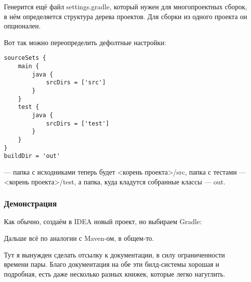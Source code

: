 \documentclass[a5paper]{article}
\begin{document}
Генерится ещё файл settings.gradle, который нужен для многопроектных сборок, в нём определяется структура дерева проектов. Для сборки из одного проекта он опционален.

Вот так можно переопределить дефолтные настройки:

\begin{verbatim}
sourceSets {
    main {
        java {
            srcDirs = ['src']
        }
    }
    test {
        java {
            srcDirs = ['test']
        }
    }
}
buildDir = 'out'
\end{verbatim}

--- папка с исходниками теперь будет <корень проекта>/src, папка с тестами --- <корень проекта>/test, а папка, куда кладутся собранные классы --- out.

\subsubsection{Демонстрация}

Как обычно, создаём в IDEA новый проект, но выбираем Gradle:

Дальше всё по аналогии с Maven-ом, в общем-то.

Тут я вынужден сделать отсылку к документации, в силу ограниченности времени пары. Благо документация на обе эти билд-системы хорошая и подробная, есть даже несколько разных книжек, которые легко нагуглить.
\end{document}

